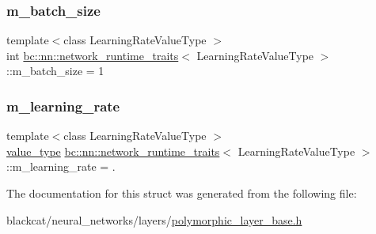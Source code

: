 \subsubsection{\texorpdfstring{m\+\_\+batch\+\_\+size}{m\_batch\_size}}
{\footnotesize\ttfamily template$<$class Learning\+Rate\+Value\+Type $>$ \\
int \hyperlink{structbc_1_1nn_1_1network__runtime__traits}{bc\+::nn\+::network\+\_\+runtime\+\_\+traits}$<$ Learning\+Rate\+Value\+Type $>$\+::m\+\_\+batch\+\_\+size = 1}

\mbox{\label{structbc_1_1nn_1_1network__runtime__traits_afee9be6763ad03156399d47ffeb363dc}} 
\subsubsection{\texorpdfstring{m\+\_\+learning\+\_\+rate}{m\_learning\_rate}}
{\footnotesize\ttfamily template$<$class Learning\+Rate\+Value\+Type $>$ \\
\hyperlink{structbc_1_1nn_1_1network__runtime__traits_a1321d62a8c691fc6e6d14c8f100d457b}{value\+\_\+type} \hyperlink{structbc_1_1nn_1_1network__runtime__traits}{bc\+::nn\+::network\+\_\+runtime\+\_\+traits}$<$ Learning\+Rate\+Value\+Type $>$\+::m\+\_\+learning\+\_\+rate = .}



The documentation for this struct was generated from the following file\+:\begin{DoxyCompactItemize}
\item 
blackcat/neural\+\_\+networks/layers/\hyperlink{layers_2polymorphic__layer__base_8h}{polymorphic\+\_\+layer\+\_\+base.\+h}\end{DoxyCompactItemize}
